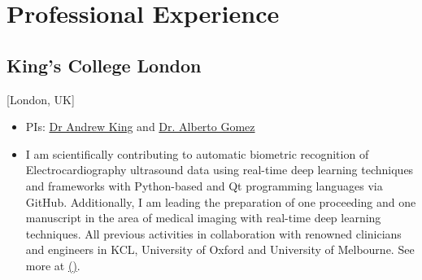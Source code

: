 \documentclass{mycv}
\begin{document}

\section{Professional Experience}

\subsection{King's College London}[London, UK]
\begin{positions}
\end{positions}
\begin{itemize}
  \item PIs: \href{http://kclmmag.org/}{Dr Andrew King} and  \href{https://gomezalberto.github.io/}{Dr. Alberto Gomez}
  \item I am scientifically contributing to automatic biometric recognition of Electrocardiography ultrasound data using real-time deep learning techniques and frameworks with Python-based and Qt programming languages via GitHub.
Additionally, I am leading the preparation of one proceeding and one manuscript in the area of medical imaging with real-time deep learning techniques.
All previous activities in collaboration with renowned clinicians and engineers in KCL, University of Oxford and University of Melbourne. 
See more at \href{http://vital.oucru.org/major-partners/kings-college-london/}{(\faExternalLink)}.
\end{itemize}
\end{document}
